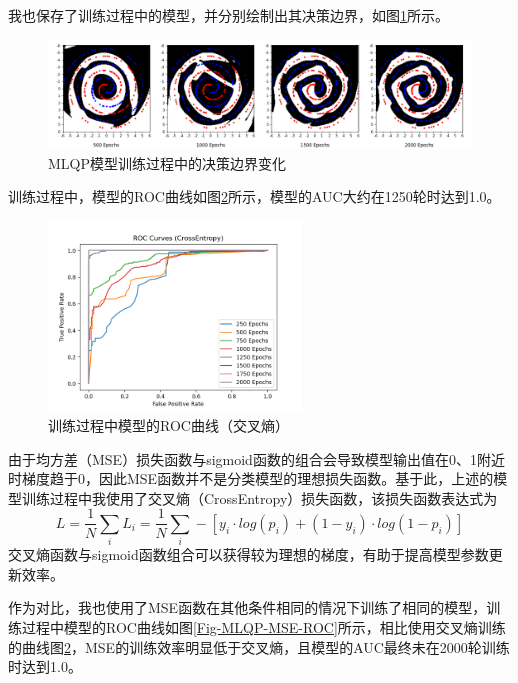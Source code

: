 \documentclass[12pt, a4paper, oneside]{ctexart}
\begin{document}
    我也保存了训练过程中的模型，并分别绘制出其决策边界，如图\ref{Fig-MLQP-process-boundary}所示。

    \begin{figure}[htbp]
        \centering
        \includegraphics[width=1.0\textwidth]{figures/MLQP_process_boundary.png}
        \caption{MLQP模型训练过程中的决策边界变化}
        \label{Fig-MLQP-process-boundary}
    \end{figure}

    训练过程中，模型的ROC曲线如图\ref{Fig-MLQP-CrossEntropy-ROC}所示，模型的AUC大约在1250轮时达到1.0。

    \begin{figure}[htbp]
        \centering
        \includegraphics[width=0.6\textwidth]{figures/CrossEntropy_ROC.png}
        \caption{训练过程中模型的ROC曲线（交叉熵）}
        \label{Fig-MLQP-CrossEntropy-ROC}
    \end{figure}

    由于均方差（MSE）损失函数与sigmoid函数的组合会导致模型输出值在0、1附近时梯度趋于0，因此MSE函数并不是分类模型的理想损失函数。基于此，上述的模型训练过程中我使用了交叉熵（CrossEntropy）损失函数，该损失函数表达式为
    $$L=\frac{1}{N}\sum_{i}L_i=\frac{1}{N}\sum_{i}-[y_i\cdot log(p_i)+(1-y_i)\cdot log(1-p_i)]$$
    交叉熵函数与sigmoid函数组合可以获得较为理想的梯度，有助于提高模型参数更新效率。

    作为对比，我也使用了MSE函数在其他条件相同的情况下训练了相同的模型，训练过程中模型的ROC曲线如图\ref{Fig-MLQP-MSE-ROC}所示，相比使用交叉熵训练的曲线图\ref{Fig-MLQP-CrossEntropy-ROC}，MSE的训练效率明显低于交叉熵，且模型的AUC最终未在2000轮训练时达到1.0。
\end{document}

